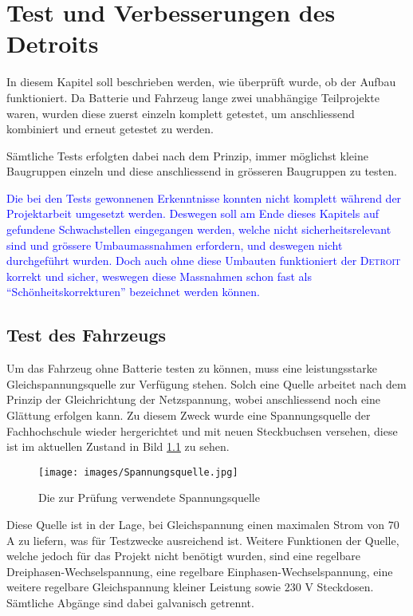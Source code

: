 \chapter{Test und Verbesserungen des Detroits}
In diesem Kapitel soll beschrieben werden, wie überprüft wurde, ob der Aufbau funktioniert. Da Batterie und Fahrzeug lange zwei unabhängige Teilprojekte waren, wurden diese zuerst einzeln komplett getestet, um anschliessend kombiniert und erneut getestet zu werden.

Sämtliche Tests erfolgten dabei nach dem Prinzip, immer möglichst kleine Baugruppen einzeln und diese anschliessend in grösseren Baugruppen zu testen.

\textcolor{blue}{Die bei den Tests gewonnenen Erkenntnisse konnten nicht komplett während der Projektarbeit umgesetzt werden. Deswegen soll am Ende dieses Kapitels auf gefundene Schwachstellen eingegangen werden, welche nicht sicherheitsrelevant sind und grössere Umbaumassnahmen erfordern, und deswegen nicht durchgeführt wurden. Doch auch ohne diese Umbauten funktioniert der \textsc{Detroit} korrekt und sicher, weswegen diese Massnahmen schon fast als "`Schönheitskorrekturen"' bezeichnet werden können.}

\section{Test des Fahrzeugs}
Um das Fahrzeug ohne Batterie testen zu können, muss eine leistungsstarke Gleichspannungsquelle zur Verfügung stehen. Solch eine Quelle arbeitet nach dem Prinzip der Gleichrichtung der Netzspannung, wobei anschliessend noch eine Glättung erfolgen kann. Zu diesem Zweck wurde eine Spannungsquelle der Fachhochschule wieder hergerichtet und mit neuen Steckbuchsen versehen, diese ist im aktuellen Zustand in Bild \ref{fig:Spannungsquelle_blau} zu sehen.

\begin{figure}[h]
	\centering
		\texttt{[image: images/Spannungsquelle.jpg]}
	\caption{Die zur Prüfung verwendete Spannungsquelle}
	\label{fig:Spannungsquelle_blau}
\end{figure}

Diese Quelle ist in der Lage, bei Gleichspannung einen maximalen Strom von $70$ A zu liefern, was für Testzwecke ausreichend ist. Weitere Funktionen der Quelle, welche jedoch für das Projekt nicht benötigt wurden, sind eine regelbare Dreiphasen-Wechselspannung, eine regelbare Einphasen-Wechselspannung, eine weitere regelbare Gleichspannung kleiner Leistung sowie $230$ V Steckdosen. Sämtliche Abgänge sind dabei galvanisch getrennt.

